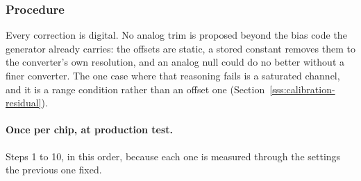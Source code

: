 
\subsubsection{Procedure}\label{sss:calibration-procedure}

Every correction is digital. No analog trim is proposed beyond the bias code the
generator already carries: the offsets are static, a stored constant removes
them to the converter's own resolution, and an analog null could do no better
without a finer converter. The one case where that reasoning fails is a
saturated channel, and it is a range condition rather than an offset one
(Section~\ref{sss:calibration-residual}).

\paragraph{Once per chip, at production test.} Steps 1 to 10, in this order,
because each one is measured through the settings the previous one fixed.

